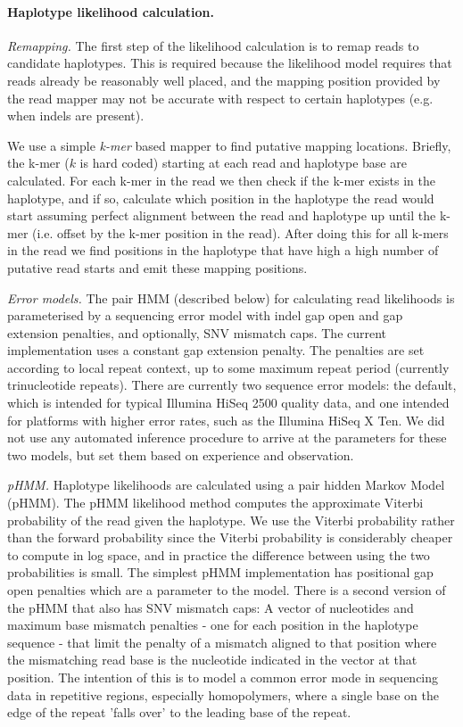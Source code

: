 \documentclass[notitlepage, twocolumn, 10pt]{article}
\begin{document}
\paragraph*{Haplotype likelihood calculation.} \emph{Remapping.} The first step of the likelihood calculation is to remap reads to candidate haplotypes. This is required because the likelihood model requires that reads already be reasonably well placed, and the mapping position provided by the read mapper may not be accurate with respect to certain haplotypes (e.g. when indels are present).

We use a simple \emph{k-mer} based mapper to find putative mapping locations. Briefly, the k-mer ($k$ is hard coded) starting at each read and haplotype base are calculated. For each k-mer in the read we then check if the k-mer exists in the haplotype, and if so, calculate which position in the haplotype the read would start assuming perfect alignment between the read and haplotype up until the k-mer (i.e. offset by the k-mer position in the read). After doing this for all k-mers in the read we find positions in the haplotype that have high a high number of putative read starts and emit these mapping positions.

\vspace{3mm}
\noindent\emph{Error models.} The pair HMM (described below) for calculating
read likelihoods is parameterised by a sequencing error model with indel gap open and gap extension penalties, and optionally, SNV mismatch caps. The current implementation uses a constant gap extension penalty. The penalties are set according to local repeat context, up to some maximum repeat period (currently trinucleotide repeats). There are currently two sequence error models: the default, which is intended for typical Illumina HiSeq 2500 quality data, and one intended for platforms with higher error rates, such as the Illumina HiSeq X Ten. We did not use any automated inference procedure to arrive at the parameters for these two models, but set them based on experience and observation.

\vspace{3mm}
\noindent\emph{pHMM.} Haplotype likelihoods are calculated using a pair hidden Markov Model (pHMM). The pHMM likelihood method computes the approximate Viterbi probability of the read given the haplotype. We use the Viterbi probability rather than the forward probability since the Viterbi probability is considerably cheaper to compute in log space, and in practice the difference between using the two probabilities is small. The simplest pHMM implementation has positional gap open penalties which are a parameter to the model. There is a second version of the pHMM that also has SNV mismatch caps: A vector of nucleotides and maximum base mismatch penalties - one for each position in the haplotype sequence - that limit the penalty of a mismatch aligned to that position where the mismatching read base is the nucleotide indicated in the vector at that position. The intention of this is to model a common error mode in sequencing data in repetitive regions, especially homopolymers, where a single base on the edge of the repeat 'falls over' to the leading base of the repeat.
\end{document}
